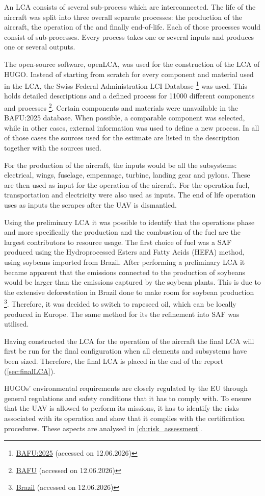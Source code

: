 An LCA consists of several sub-process which are interconnected. The life of the aircraft was split into three overall separate processes: the production of the aircraft, the operation of the and finally end-of-life. Each of those processes would consist of sub-processes. Every process takes one or several inputs and produces one or several outputs.

The open-source software, openLCA, was used for the construction of the LCA of HUGO.  Instead of starting from scratch for every component and material used in the LCA, the Swiss Federal Administration LCI Database \footnote{\href{https://esu-services.ch/bafu2025/}{BAFU:2025} (accessed on 12.06.2026)} was used. This holds detailed descriptions and a defined process for 11000 different components and processes \footnote{\href{https://nexus.openlca.org/database/BAFU}{BAFU} (accessed on 12.06.2026)}. Certain components and materials were unavailable in the BAFU:2025 database. When possible, a comparable component was selected, while in other cases, external information was used to define a new process.
In all of those cases the sources used for the estimate are listed in the description together with the sources used.  

For the production of the aircraft, the inputs would be all the subsystems: electrical, wings, fuselage, empennage, turbine, landing gear and pylons. These are then used as input for the operation of the aircraft. For the operation fuel, transportation and electricity were also used as inputs.   The end of life operation uses as inputs the scrapes after the UAV is dismantled.

Using the preliminary LCA it was possible to identify that the operations phase and more specifically the production and the combustion of the fuel are the largest contributors to resource usage. The first choice of fuel was a SAF produced using the Hydroprocessed Esters and Fatty Acids (HEFA) method, using soybeans imported from Brazil. After performing a preliminary LCA it became apparent that the emissions connected to the production of soybeans would be larger than the emissions captured by the soybean plants. This is due to the extensive deforestation in Brazil done to make room for soybean production \footnote{\href{https://www.sei.org/features/brazilian-soy-exports-and-deforestation/}{Brazil} (accessed on 12.06.2026)}. Therefore, it was decided to switch to rapeseed oil, which can be locally produced in Europe. The same method for its the refinement into SAF was utilised. 

Having constructed the LCA for the operation of the aircraft the final LCA will first be run for the final configuration when all elements and subsystems have been sized. Therefore, the final LCA is placed in the end of the report (\autoref{sec:finalLCA}). 

HUGOs' environmental requirements are closely regulated by the EU through general regulations and safety conditions that it has to comply with. To ensure that the UAV is allowed to perform its missions, it has to identify the risks associated with its operation and show that it complies with the certification procedures. These aspects are analysed in \autoref{ch:risk_assessment}.

